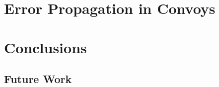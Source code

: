 \documentclass[12pt]{report}
\begin{document}
\chapter{Error Propagation in Convoys}
\label{chap:errprop}




\chapter{Conclusions}
\label{chap:concl}


\section{Future Work}
\label{sec:futwork}





\nocite{travisdiss}
\nocite{travisshort}
\nocite{calgary}

\end{document}
